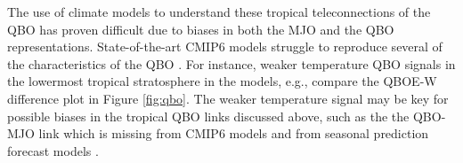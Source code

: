The use of climate models to understand these tropical teleconnections of the QBO has proven difficult due to biases in both the MJO and the QBO representations. State-of-the-art CMIP6 models struggle to reproduce several of the characteristics of the QBO \citep{richter2020}. For instance,  weaker temperature QBO signals in the lowermost tropical stratosphere in the models, e.g., compare the QBOE-W difference plot in Figure \ref{fig:qbo}. The weaker temperature signal may be key for possible biases in the tropical QBO links discussed above, such as the the QBO-MJO link which is missing from CMIP6 models \citep{kim2020} and from seasonal prediction forecast models \citep{wang2019,martin2020jgr}. 